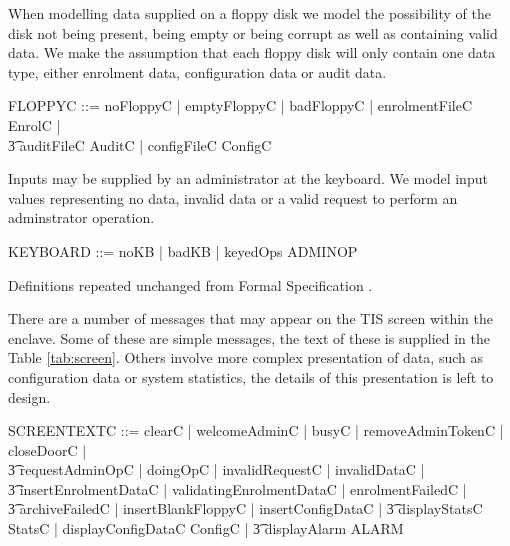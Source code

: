 When modelling data supplied on a floppy disk we model the possibility
of the disk not being present, being empty or being corrupt as well as
containing valid data.
We make the assumption that each floppy disk will only contain one
data type, either enrolment data, configuration data or audit data.

\begin{zed}
       FLOPPYC ::=  noFloppyC | emptyFloppyC | badFloppyC | 
       enrolmentFileC \ldata EnrolC \rdata |
\\ \t3    auditFileC \ldata \finset AuditC \rdata |
          configFileC \ldata ConfigC \rdata
\end{zed}

Inputs may be supplied by an administrator at the keyboard. We model
input values representing no data, invalid data or a valid request to
perform an adminstrator operation.
\begin{zed}
        KEYBOARD ::= noKB | badKB | keyedOps \ldata ADMINOP \rdata 
\end{zed}
\begin{Zcomment}
\item Definitions repeated unchanged from Formal Specification \cite{FS}.
\end{Zcomment}

There are a number of messages that may appear on the TIS screen
within the enclave. Some of these are simple messages, the text of these
is supplied in the Table \ref{tab:screen}. 
Others involve more complex presentation of data, such as
configuration data or system statistics, the details of this
presentation is left to design.

\begin{zed}
       SCREENTEXTC ::=  clearC | welcomeAdminC | busyC | removeAdminTokenC |
       closeDoorC |
\\ \t3          requestAdminOpC | doingOpC | invalidRequestC | invalidDataC |
\\ \t3          insertEnrolmentDataC | validatingEnrolmentDataC |
       enrolmentFailedC |
\\ \t3          archiveFailedC | insertBlankFloppyC | insertConfigDataC |
\also 
        \t3  displayStatsC \ldata StatsC \rdata | 
        displayConfigDataC \ldata ConfigC \rdata |
\also   \t3 displayAlarm \ldata ALARM \rdata 

\end{zed}

